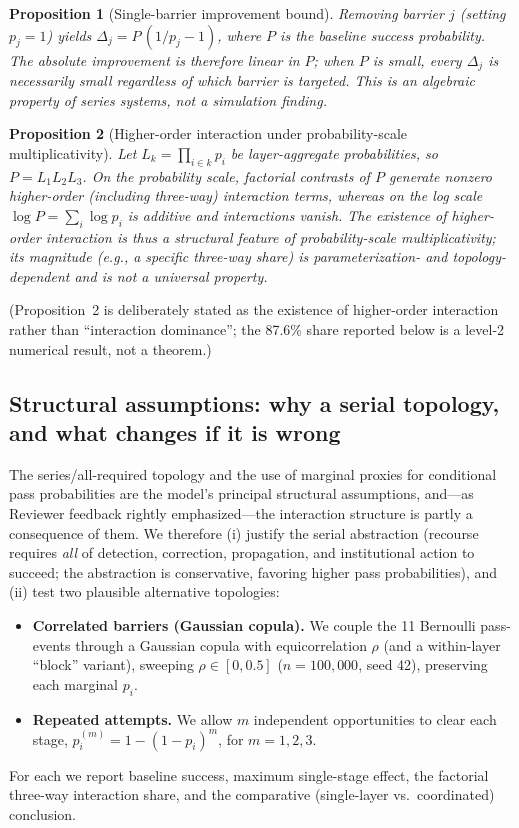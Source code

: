 \documentclass[10pt,letterpaper]{article}
\newtheorem{proposition}{Proposition}
\begin{document}
\begin{proposition}[Single-barrier improvement bound]
Removing barrier $j$ (setting $p_j=1$) yields $\Delta_j = P\,(1/p_j - 1)$, where $P$ is the baseline success probability. The absolute improvement is therefore linear in $P$; when $P$ is small, every $\Delta_j$ is necessarily small regardless of which barrier is targeted. This is an algebraic property of series systems, not a simulation finding.
\end{proposition}

\begin{proposition}[Higher-order interaction under probability-scale multiplicativity]
Let $L_k=\prod_{i\in k}p_i$ be layer-aggregate probabilities, so $P=L_1L_2L_3$. On the probability scale, factorial contrasts of $P$ generate nonzero higher-order (including three-way) interaction terms, whereas on the log scale $\log P=\sum_i\log p_i$ is additive and interactions vanish. The \emph{existence} of higher-order interaction is thus a structural feature of probability-scale multiplicativity; its \emph{magnitude} (e.g., a specific three-way share) is parameterization- and topology-dependent and is not a universal property.
\end{proposition}

\noindent(Proposition~2 is deliberately stated as the existence of higher-order interaction rather than ``interaction dominance''; the 87.6\% share reported below is a level-2 numerical result, not a theorem.)

\subsection*{Structural assumptions: why a serial topology, and what changes if it is wrong}
The series/all-required topology and the use of marginal proxies for conditional pass probabilities are the model's principal structural assumptions, and---as Reviewer feedback rightly emphasized---the interaction structure is partly a consequence of them. We therefore (i) justify the serial abstraction (recourse requires \emph{all} of detection, correction, propagation, and institutional action to succeed; the abstraction is conservative, favoring higher pass probabilities), and (ii) test two plausible alternative topologies:
\begin{itemize}
\item \textbf{Correlated barriers (Gaussian copula).} We couple the 11 Bernoulli pass-events through a Gaussian copula with equicorrelation $\rho$ (and a within-layer ``block'' variant), sweeping $\rho\in[0,0.5]$ ($n=100{,}000$, seed 42), preserving each marginal $p_i$.
\item \textbf{Repeated attempts.} We allow $m$ independent opportunities to clear each stage, $p_i^{(m)}=1-(1-p_i)^m$, for $m=1,2,3$.
\end{itemize}
For each we report baseline success, maximum single-stage effect, the factorial three-way interaction share, and the comparative (single-layer vs.\ coordinated) conclusion.
\end{document}
